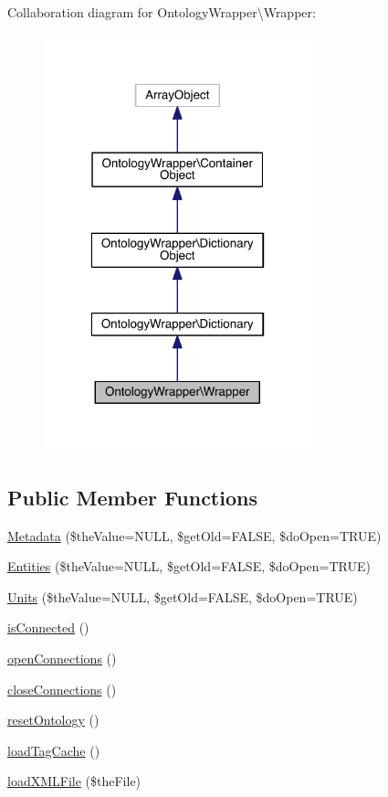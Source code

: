 Collaboration diagram for Ontology\-Wrapper\textbackslash{}Wrapper\-:
\nopagebreak
\begin{figure}[H]
\begin{center}
\leavevmode
\includegraphics[width=220pt]{class_ontology_wrapper_1_1_wrapper__coll__graph}
\end{center}
\end{figure}
\subsection*{Public Member Functions}
\begin{DoxyCompactItemize}
\item 
\hyperlink{class_ontology_wrapper_1_1_wrapper_ae309b4ad4ee20651f343d1b66220f171}{Metadata} (\$the\-Value=N\-U\-L\-L, \$get\-Old=F\-A\-L\-S\-E, \$do\-Open=T\-R\-U\-E)
\item 
\hyperlink{class_ontology_wrapper_1_1_wrapper_ad8e8437b95fb0bf93d1b0b724752311e}{Entities} (\$the\-Value=N\-U\-L\-L, \$get\-Old=F\-A\-L\-S\-E, \$do\-Open=T\-R\-U\-E)
\item 
\hyperlink{class_ontology_wrapper_1_1_wrapper_a659ceda6be0d6bcba666eda463596e48}{Units} (\$the\-Value=N\-U\-L\-L, \$get\-Old=F\-A\-L\-S\-E, \$do\-Open=T\-R\-U\-E)
\item 
\hyperlink{class_ontology_wrapper_1_1_wrapper_a94bab4d3e13b169479d5a0f9d16ea3fc}{is\-Connected} ()
\item 
\hyperlink{class_ontology_wrapper_1_1_wrapper_ae402cf57a8c037c3fe580baa252e99ac}{open\-Connections} ()
\item 
\hyperlink{class_ontology_wrapper_1_1_wrapper_a41ab06d375f9baae6349b4955ab8384e}{close\-Connections} ()
\item 
\hyperlink{class_ontology_wrapper_1_1_wrapper_a386b16160195cbb9c60d858b5677c1b4}{reset\-Ontology} ()
\item 
\hyperlink{class_ontology_wrapper_1_1_wrapper_ae03422dc6a2e5f5e03726b85f62a1f12}{load\-Tag\-Cache} ()
\item 
\hyperlink{class_ontology_wrapper_1_1_wrapper_a2ee823f34e78d0a1f2361d6da3f58532}{load\-X\-M\-L\-File} (\$the\-File)
\end{DoxyCompactItemize}
